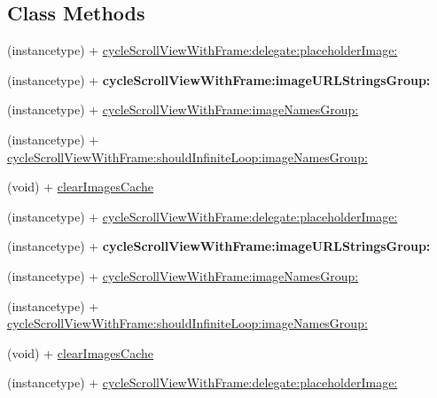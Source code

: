 \subsection*{Class Methods}
\begin{DoxyCompactItemize}
\item 
(instancetype) + \mbox{\hyperlink{interface_s_d_cycle_scroll_view_a7bde485b7df0c5b875e16aa3db88624f}{cycle\+Scroll\+View\+With\+Frame\+:delegate\+:placeholder\+Image\+:}}
\item 
\mbox{\label{interface_s_d_cycle_scroll_view_aa143023eb03f1e7d5d2c6fc273a06ec9}} 
(instancetype) + {\bfseries cycle\+Scroll\+View\+With\+Frame\+:image\+U\+R\+L\+Strings\+Group\+:}
\item 
(instancetype) + \mbox{\hyperlink{interface_s_d_cycle_scroll_view_a575db2e230e7e594b027bade1634d25d}{cycle\+Scroll\+View\+With\+Frame\+:image\+Names\+Group\+:}}
\item 
(instancetype) + \mbox{\hyperlink{interface_s_d_cycle_scroll_view_a71e89750df3ca82d3e1eef99e44ddce3}{cycle\+Scroll\+View\+With\+Frame\+:should\+Infinite\+Loop\+:image\+Names\+Group\+:}}
\item 
(void) + \mbox{\hyperlink{interface_s_d_cycle_scroll_view_a85146f335fd4ff38783b358530ad130f}{clear\+Images\+Cache}}
\item 
(instancetype) + \mbox{\hyperlink{interface_s_d_cycle_scroll_view_a7bde485b7df0c5b875e16aa3db88624f}{cycle\+Scroll\+View\+With\+Frame\+:delegate\+:placeholder\+Image\+:}}
\item 
\mbox{\label{interface_s_d_cycle_scroll_view_aa143023eb03f1e7d5d2c6fc273a06ec9}} 
(instancetype) + {\bfseries cycle\+Scroll\+View\+With\+Frame\+:image\+U\+R\+L\+Strings\+Group\+:}
\item 
(instancetype) + \mbox{\hyperlink{interface_s_d_cycle_scroll_view_a575db2e230e7e594b027bade1634d25d}{cycle\+Scroll\+View\+With\+Frame\+:image\+Names\+Group\+:}}
\item 
(instancetype) + \mbox{\hyperlink{interface_s_d_cycle_scroll_view_a71e89750df3ca82d3e1eef99e44ddce3}{cycle\+Scroll\+View\+With\+Frame\+:should\+Infinite\+Loop\+:image\+Names\+Group\+:}}
\item 
(void) + \mbox{\hyperlink{interface_s_d_cycle_scroll_view_a85146f335fd4ff38783b358530ad130f}{clear\+Images\+Cache}}
\item 
(instancetype) + \mbox{\hyperlink{interface_s_d_cycle_scroll_view_a7bde485b7df0c5b875e16aa3db88624f}{cycle\+Scroll\+View\+With\+Frame\+:delegate\+:placeholder\+Image\+:}}

\end{DoxyCompactItemize}

